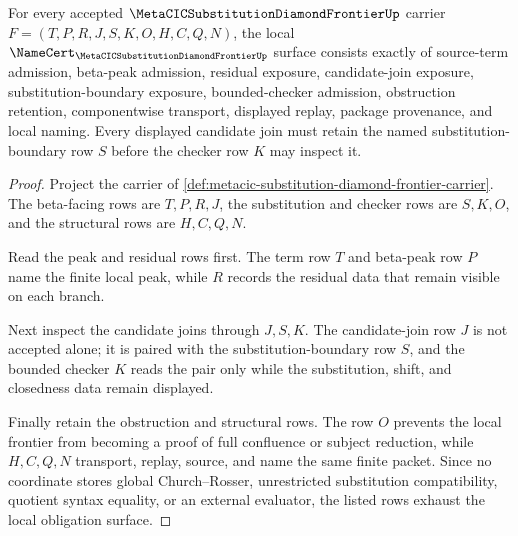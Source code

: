 \begin{theorem}
\label{thm:metacic-substitution-diamond-frontier-obligations}
For every accepted $\MetaCICSubstitutionDiamondFrontierUp$ carrier $F=(T,P,R,J,S,K,O,H,C,Q,N)$, the local $\NameCert_{\MetaCICSubstitutionDiamondFrontierUp}$ surface consists exactly of source-term admission, beta-peak admission, residual exposure, candidate-join exposure, substitution-boundary exposure, bounded-checker admission, obstruction retention, componentwise transport, displayed replay, package provenance, and local naming. Every displayed candidate join must retain the named substitution-boundary row $S$ before the checker row $K$ may inspect it.
\end{theorem}
\begin{proof}
Project the carrier of \autoref{def:metacic-substitution-diamond-frontier-carrier}. The beta-facing rows are $T,P,R,J$, the substitution and checker rows are $S,K,O$, and the structural rows are $H,C,Q,N$.

Read the peak and residual rows first. The term row $T$ and beta-peak row $P$ name the finite local peak, while $R$ records the residual data that remain visible on each branch.

Next inspect the candidate joins through $J,S,K$. The candidate-join row $J$ is not accepted alone; it is paired with the substitution-boundary row $S$, and the bounded checker $K$ reads the pair only while the substitution, shift, and closedness data remain displayed.

Finally retain the obstruction and structural rows. The row $O$ prevents the local frontier from becoming a proof of full confluence or subject reduction, while $H,C,Q,N$ transport, replay, source, and name the same finite packet. Since no coordinate stores global Church--Rosser, unrestricted substitution compatibility, quotient syntax equality, or an external evaluator, the listed rows exhaust the local obligation surface.
\end{proof}



